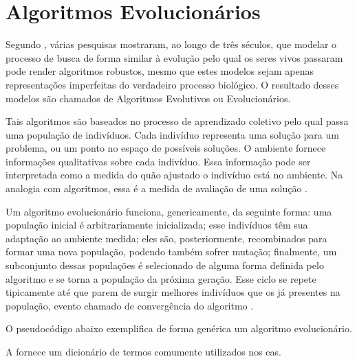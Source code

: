 \chapter{Algoritmos Evolucionários}

Segundo \citep{Back:1993:OEA:1326623.1326625}, várias pesquisas mostraram, ao 
longo de três séculos, que modelar o processo de busca de forma similar à evolução 
pelo qual os seres vivos passaram pode render algoritmos robustos, mesmo que 
estes modelos sejam apenas representações imperfeitas do verdadeiro processo 
biológico. O resultado desses modelos são chamados de Algoritmos Evolutivos ou 
Evolucionários.

Tais algoritmos são baseados no processo de aprendizado coletivo pelo qual passa 
uma população de indivíduos. Cada indivíduo representa uma solução para um 
problema, ou um ponto no espaço de possíveis soluções. O ambiente fornece 
informações qualitativas sobre cada indivíduo. Essa informação pode ser 
interpretada como a medida do quão ajustado o indivíduo está no ambiente. Na 
analogia com algoritmos, essa é a medida de avaliação de uma solução 
\citep{Back:1993:OEA:1326623.1326625}.

Um algoritmo evolucionário funciona, genericamente, da seguinte forma: uma 
população inicial é arbitrariamente inicializada; esse indivíduos têm sua 
adaptação ao ambiente medida; eles são, posteriormente, recombinados para formar 
uma nova população, podendo também sofrer mutação; finalmente, um subconjunto 
dessas populações é selecionado de alguma forma definida pelo algoritmo e se 
torna a população da próxima geração. Esse ciclo se repete tipicamente até que 
parem de surgir melhores indivíduos que os já presentes na população, evento 
chamado de convergência do algoritmo \citep{Back:1993:OEA:1326623.1326625}.

O pseudocódigo abaixo exemplifica de forma genérica um algoritmo evolucionário.

A  fornece um dicionário de termos comumente utilizados nos 
\acp{ea}.